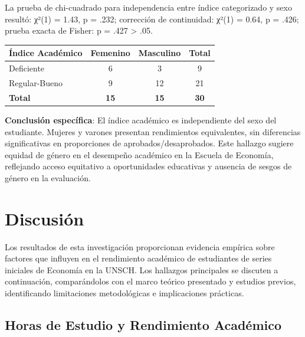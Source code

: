 \documentclass[
  stu,
  floatsintext,
  longtable,
  a4paper,
  nolmodern,
  notxfonts,
  notimes,
  12pt,
  colorlinks=true,linkcolor=blue,citecolor=blue,urlcolor=blue]{apa7}
\newcounter{none} %
\begin{document}
La prueba de chi-cuadrado para independencia entre índice categorizado y
sexo resultó: χ²(1) = 1.43, p = .232; corrección de continuidad: χ²(1) =
0.64, p = .426; prueba exacta de Fisher: p = .427 \textgreater{} .05.

\begin{table}

{\caption{{Tabla Cruzada Índice Académico y
Sexo}{\label{tbl-indice-sexo}}}}

{\def\LTcaptype{none} %
\begin{longtable}[]{@{}lccc@{}}
\toprule\noalign{}
Índice Académico & Femenino & Masculino & Total \\
\midrule\noalign{}
\endhead
\bottomrule\noalign{}
\endlastfoot
Deficiente & 6 & 3 & 9 \\
Regular-Bueno & 9 & 12 & 21 \\
\textbf{Total} & \textbf{15} & \textbf{15} & \textbf{30} \\
\end{longtable}
}

\end{table}

\textbf{Conclusión específica}: El índice académico es independiente del
sexo del estudiante. Mujeres y varones presentan rendimientos
equivalentes, sin diferencias significativas en proporciones de
aprobados/desaprobados. Este hallazgo sugiere equidad de género en el
desempeño académico en la Escuela de Economía, reflejando acceso
equitativo a oportunidades educativas y ausencia de sesgos de género en
la evaluación.

\section{Discusión}\label{discusiuxf3n}

Los resultados de esta investigación proporcionan evidencia empírica
sobre factores que influyen en el rendimiento académico de estudiantes
de series iniciales de Economía en la UNSCH. Los hallazgos principales
se discuten a continuación, comparándolos con el marco teórico
presentado y estudios previos, identificando limitaciones metodológicas
e implicaciones prácticas.

\subsection{Horas de Estudio y Rendimiento
Académico}\label{horas-de-estudio-y-rendimiento-acaduxe9mico}
\end{document}
